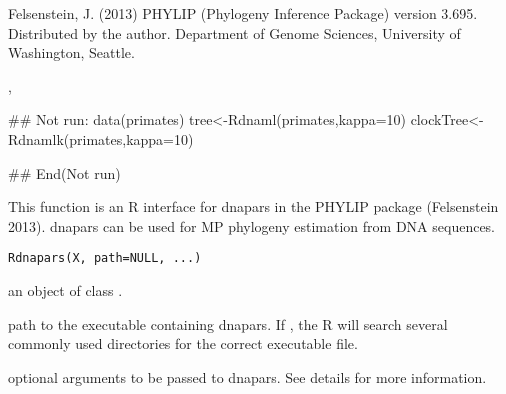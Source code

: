 \documentclass[a4paper]{book}
\begin{document}
%
\begin{References}\relax
Felsenstein, J. (2013) PHYLIP (Phylogeny Inference Package) version 3.695. Distributed by the author. Department of Genome Sciences, University of Washington, Seattle.
\end{References}
%
\begin{SeeAlso}\relax
{}, 
\end{SeeAlso}
%
\begin{Examples}
\begin{ExampleCode}
## Not run: 
data(primates)
tree<-Rdnaml(primates,kappa=10)
clockTree<-Rdnamlk(primates,kappa=10)

## End(Not run)
\end{ExampleCode}
\end{Examples}
%
\begin{Description}\relax
This function is an R interface for dnapars in the PHYLIP package (Felsenstein 2013). dnapars can be used for MP phylogeny estimation from DNA sequences.
\end{Description}
%
\begin{Usage}
\begin{verbatim}
Rdnapars(X, path=NULL, ...)
\end{verbatim}
\end{Usage}
%
\begin{Arguments}
\begin{ldescription}
\item[\code{X}] an object of class .
\item[\code{path}] path to the executable containing dnapars. If , the R will search several commonly used directories for the correct executable file.
\item[\code{...}] optional arguments to be passed to dnapars. See details for more information.
\end{ldescription}
\end{Arguments}
%
\end{document}
